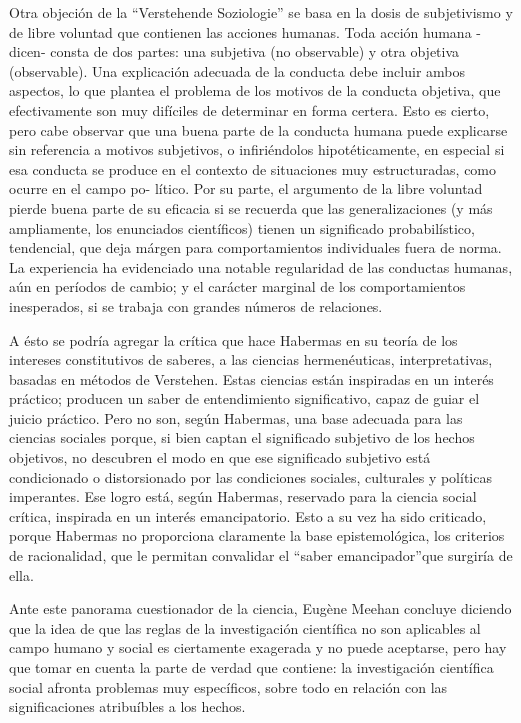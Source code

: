 \documentclass[
]{book}
\begin{document}
Otra objeción de la ``Verstehende Soziologie'' se basa en la dosis de subjetivismo y de libre voluntad que contienen las acciones humanas. Toda acción humana -dicen- consta de dos partes: una subjetiva (no observable) y otra objetiva (observable). Una explicación adecuada de la conducta debe incluir ambos aspectos, lo que plantea el problema de los motivos de la conducta objetiva, que efectivamente son muy difíciles de determinar en forma certera. Esto es cierto, pero cabe observar que una buena parte de la conducta humana puede explicarse sin referencia a motivos subjetivos, o infiriéndolos hipotéticamente, en especial si esa conducta se produce en el contexto de situaciones muy estructuradas, como ocurre en el campo po- lítico. Por su parte, el argumento de la libre voluntad pierde buena parte de su eficacia si se recuerda que las generalizaciones (y más ampliamente, los enunciados científicos) tienen un significado probabilístico, tendencial, que deja márgen para comportamientos individuales fuera de norma. La experiencia ha evidenciado una notable regularidad de las conductas humanas, aún en períodos de cambio; y el carácter marginal de los comportamientos inesperados, si se trabaja con grandes números de relaciones.

A ésto se podría agregar la crítica que hace Habermas en su teoría de los intereses constitutivos de saberes, a las ciencias hermenéuticas, interpretativas, basadas en métodos de Verstehen. Estas ciencias están inspiradas en un interés práctico; producen un saber de entendimiento significativo, capaz de guiar el juicio práctico. Pero no son, según Habermas, una base adecuada para las ciencias sociales porque, si bien captan el significado subjetivo de los hechos objetivos, no descubren el modo en que ese significado subjetivo está condicionado o distorsionado por las condiciones sociales, culturales y políticas imperantes. Ese logro está, según Habermas, reservado para la ciencia social crítica, inspirada en un interés emancipatorio. Esto a su vez ha sido criticado, porque Habermas no proporciona claramente la base epistemológica, los criterios de racionalidad, que le permitan convalidar el ``saber emancipador''que surgiría de ella.

Ante este panorama cuestionador de la ciencia, Eugène Meehan concluye diciendo que la idea de que las reglas de la investigación científica no son aplicables al campo humano y social es ciertamente exagerada y no puede aceptarse, pero hay que tomar en cuenta la parte de verdad que contiene: la investigación científica social afronta problemas muy específicos, sobre todo en relación con las significaciones atribuíbles a los hechos.
\end{document}
